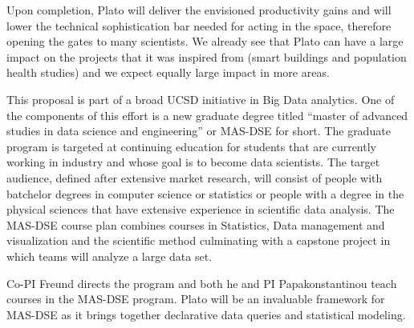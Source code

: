 \documentclass{article}
\renewcommand{\paragraph}[1]{{\noindent {\bf #1}}}
\begin{document}
Upon completion, Plato will deliver the envisioned productivity gains and will lower the technical sophistication bar needed for acting in the space, therefore opening the gates to many scientists. We already see that Plato can have a large impact on the projects that it was inspired from (smart buildings and population health studies) and we expect equally large impact in more areas.

\paragraph{Education} This proposal is part of a broad UCSD initiative in Big Data
analytics. One of the components of this effort is a new graduate
degree titled ``master of advanced studies in data science and
engineering'' or MAS-DSE for short. The graduate program is targeted
at continuing education for students that are currently working in
industry and whose goal is to become data scientists. The target
audience, defined after extensive market research, will consist of
people with batchelor degrees in computer science or statistics or
people with a degree in the physical sciences that have extensive
experience in scientific data analysis. The MAS-DSE course plan
combines courses in Statistics, Data management and visualization and
the scientific method culminating with a capstone project in which
teams will analyze a large data set.

Co-PI Freund directs the program and both he and PI Papakonstantinou
teach courses in the MAS-DSE program. Plato will be an
invaluable framework for MAS-DSE as it brings together declarative
data queries and statistical modeling.
\end{document}
